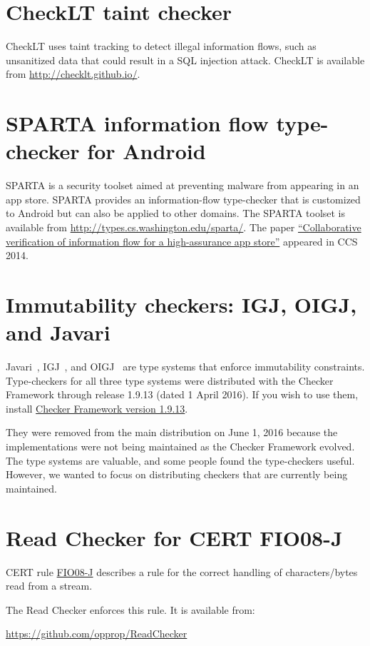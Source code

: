 \section{CheckLT taint checker\label{checklt-checker}}

CheckLT uses taint tracking to detect illegal information flows, such as
unsanitized data that could result in a SQL injection attack.
CheckLT is available from \url{http://checklt.github.io/}.


\section{SPARTA information flow type-checker for Android\label{sparta-checker}}

SPARTA is a security toolset aimed at preventing malware from appearing in
an app store.  SPARTA provides an information-flow type-checker that is
customized to Android but can also be applied to other domains.
The SPARTA toolset is available from
\url{http://types.cs.washington.edu/sparta/}.
The paper
\href{http://homes.cs.washington.edu/~mernst/pubs/infoflow-ccs2014.pdf}{``Collaborative
    verification of information flow for a high-assurance app store''}
  appeared in CCS 2014.


\section{Immutability checkers:  IGJ, OIGJ, and Javari\label{igj-checker}\label{javari-checker}}

Javari~\cite{TschantzE2005}, IGJ~\cite{ZibinPAAKE2007}, and
OIGJ~\cite{ZibinPLAE2010} are type systems that enforce immutability
constraints.  Type-checkers for all three type systems were distributed
with the Checker Framework through release 1.9.13 (dated 1 April 2016).
If you wish to use them, install
\href{http://types.cs.washington.edu/checker-framework/releases/1.9.13/}{Checker
  Framework version 1.9.13}.

They were removed from the main distribution on June 1, 2016 because the
implementations were not being maintained as the Checker Framework evolved.
The type systems are valuable, and some people found the type-checkers
useful.  However,
we wanted
to focus on distributing checkers that are currently being maintained.


\section{Read Checker for CERT FIO08-J\label{read-checker}}

CERT
rule \href{https://www.securecoding.cert.org/confluence/display/java/FIO08-J.+Distinguish+between+characters+or+bytes+read+from+a+stream+and+-1}{FIO08-J}
describes a rule for the correct handling of characters/bytes read
from a stream.

The Read Checker enforces this rule.
It is available from:

\url{https://github.com/opprop/ReadChecker}



